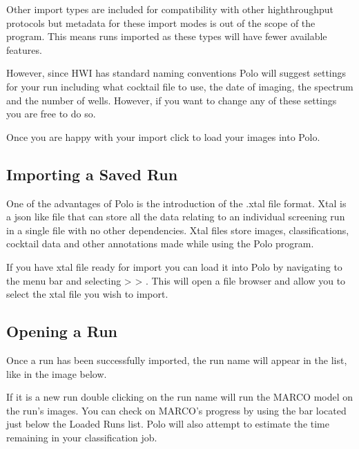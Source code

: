 \documentclass[letterpaper,10pt,english]{sphinxmanual}
\begin{document}
Other import types are included for compatibility with other
high\sphinxhyphen{}throughput protocols but metadata for these import modes is out of
the scope of the program. This means runs imported as these types will have
fewer available features.

However, since HWI has standard naming conventions Polo will suggest settings for your
run including what cocktail file to use, the date of imaging, the spectrum
and the number of wells. However, if you want to change any of these settings
you are free to do so.

Once you are happy with your import click  to load your
images into Polo.


\subsection{Importing a Saved Run}
\label{\detokenize{user_guide:importing-a-saved-run}}
One of the advantages of Polo is the introduction of the .xtal file format.
Xtal is a json like file that can store all the data relating to an individual
screening run in a single file with no other dependencies. Xtal files store
images, classifications, cocktail data and other annotations made while using
the Polo program.

If you have xtal file ready for import you can load it into Polo by navigating
to the menu bar and selecting  \sphinxhyphen{}\textgreater{}  \sphinxhyphen{}\textgreater{} .
This will open a file browser and allow you to select the xtal file you wish
to import.


\subsection{Opening a Run}
\label{\detokenize{user_guide:opening-a-run}}
Once a run has been successfully imported, the run name will appear in the
 list, like in the image below.

If it is a new run double clicking on the run name will run the MARCO model
on the run’s images. You can check on MARCO’s progress by using the
 bar located just below the Loaded Runs list. Polo
will also attempt to estimate the time remaining in your classification job.
\begin{quote}

\noindent{}
\end{quote}
\end{document}
